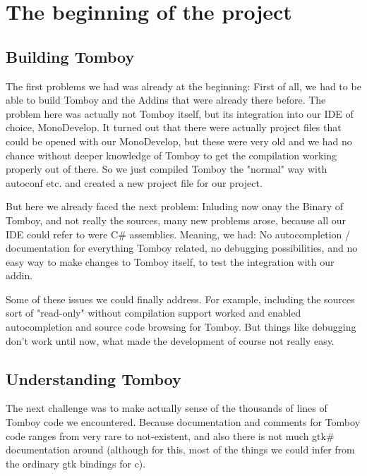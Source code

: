 \section{The beginning of the project} %
\label{beginning}

\subsection{Building Tomboy}
\label{building_tomboy}
The first problems we had was already at the beginning: First of all, we had to be able to build Tomboy and the Addins that were already there before. The problem here was actually not Tomboy itself, but its integration into our IDE of choice, MonoDevelop. It turned out that there were actually project files that could be opened with our MonoDevelop, but these were very old and we had no chance without deeper knowledge of Tomboy to get the compilation working properly out of there. So we just compiled Tomboy the "normal" way with autoconf etc. and created a new project file for our project.

But here we already faced the next problem: Inluding now onay the Binary of Tomboy, and not really the sources, many new problems arose, because all our IDE could refer to were C\# assemblies. Meaning, we had: No autocompletion / documentation for everything Tomboy related, no debugging possibilities, and no easy way to make changes to Tomboy itself, to test the integration with our addin.

Some of these issues we could finally address. For example, including the sources sort of "read-only" without compilation support worked and enabled autocompletion and source code browsing for Tomboy. But things like debugging don't work until now, what made the development of course not really easy.

\subsection{Understanding Tomboy}
\label{understanding_tomboy}
The next challenge was to make actually sense of the thousands of lines of Tomboy code we encountered. Because documentation and comments for Tomboy code ranges from very rare to not-existent, and also there is not much gtk\# documentation around (although for this, most of the things we could infer from the ordinary gtk bindings for c).

